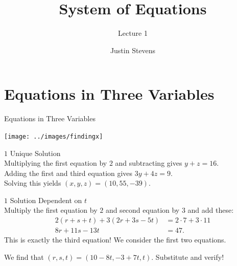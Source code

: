 \documentclass[xcolor=dvipsnames, fontsize=11pt, %
pagesize, %
parskip=half-, t]{beamer}
\title[System of Equations (Lecture 1)]{System of Equations}
\subtitle{Lecture 1}
\author[Justin Stevens (Star League)]{\large Justin Stevens} %
\date{}
\begin{document}
\begin{frame}[c]
\centering
\titlepage
\end{frame}

\section{Equations in Three Variables}
\begin{frame}[c]{Equations in Three Variables}
	\centering
\end{frame}

\begin{frame}[c]
	\centering
	\texttt{[image: ../images/findingx]}
\end{frame}

\begin{frame}{$1$ Unique Solution}
		 ~\\
	Multiplying the first equation by $2$ and subtracting gives $y+z=16$. ~\\
	
Adding the first and third equation gives $3y+4z=9$. ~\\

Solving this yields $(x, y, z)=(10, 55, -39)$. 
\end{frame}

\begin{frame}{$1$ Solution Dependent on $t$}
 ~\\
Multiply the first equation by $2$ and second equation by $3$ and add these: \begin{align*} 2\left(r+s+t\right)+3\left(2r+3s-5t\right)&=2\cdot 7+3\cdot 11 \\
8r+11s-13t&=47. \end{align*}
This is exactly the third equation! We consider the first two equations. \medskip 

We find that $(r, s, t)=(10-8t, -3+7t, t)$. Substitute and verify!		
\end{frame}
\end{document}
